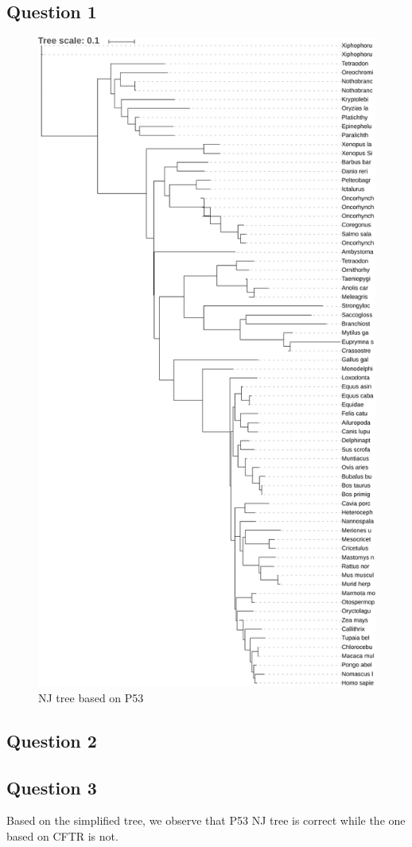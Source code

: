 \documentclass[]{article}
\begin{document}
\subsection{Question 1}
\begin{figure}[!h]
	\includegraphics*[width = \linewidth, height = 0.85\textheight]{NJ_P53.pdf}
	\caption{NJ tree based on P53}
\end{figure}

\subsection{Question 2}

\subsection{Question 3}
Based on the simplified tree, we observe that P53 NJ tree is correct while the one based on CFTR is not.
\end{document}
